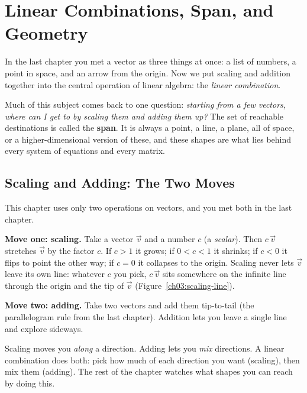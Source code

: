 \chapter{Linear Combinations, Span, and Geometry}

In the last chapter you met a vector as three things at once: a list of numbers, a point in space, and an arrow from the origin. Now we put scaling and addition together into the central operation of linear algebra: the \emph{linear combination}.

Much of this subject comes back to one question: \emph{starting from a few vectors, where can I get to by scaling them and adding them up?} The set of reachable destinations is called the \textbf{span}. It is always a point, a line, a plane, all of space, or a higher-dimensional version of these, and these shapes are what lies behind every system of equations and every matrix.

\chapterline

\section{Scaling and Adding: The Two Moves}

This chapter uses only two operations on vectors, and you met both in the last chapter.

\textbf{Move one: scaling.} Take a vector $\vec{v}$ and a number $c$ (a \emph{scalar}). Then $c\,\vec{v}$ stretches $\vec{v}$ by the factor $c$. If $c>1$ it grows; if $0<c<1$ it shrinks; if $c<0$ it flips to point the other way; if $c=0$ it collapses to the origin. Scaling never lets $\vec{v}$ leave its own line: whatever $c$ you pick, $c\,\vec{v}$ sits somewhere on the infinite line through the origin and the tip of $\vec{v}$ (Figure~\ref{ch03:scaling-line}).

\textbf{Move two: adding.} Take two vectors and add them tip-to-tail (the parallelogram rule from the last chapter). Addition lets you leave a single line and explore sideways.

\begin{intuitionbox}
Scaling moves you \emph{along} a direction. Adding lets you \emph{mix} directions. A linear combination does both: pick how much of each direction you want (scaling), then mix them (adding). The rest of the chapter watches what shapes you can reach by doing this.
\end{intuitionbox}

